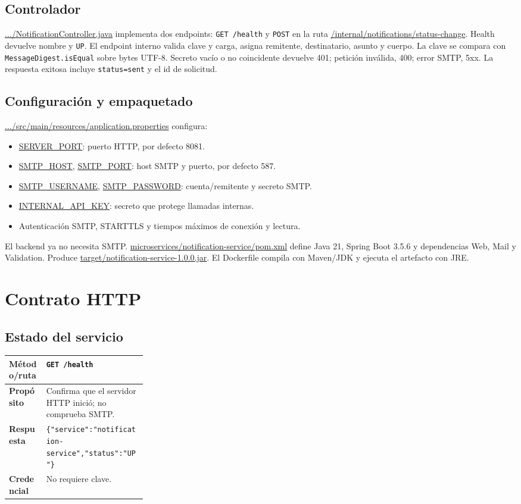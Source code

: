 \documentclass[11pt,a4paper]{article}
\newcommand{\pathcode}[1]{\small\url{#1}}\newcommand{\envvar}[1]{\small\url{#1}}
\begin{document}
\subsection{Controlador}
\pathcode{.../NotificationController.java} implementa dos endpoints: \texttt{GET /health} y \texttt{POST} en la ruta \pathcode{/internal/notifications/status-change}. Health devuelve nombre y \texttt{UP}. El endpoint interno valida clave y carga, asigna remitente, destinatario, asunto y cuerpo.
La clave se compara con \texttt{MessageDigest.isEqual} sobre bytes UTF-8. Secreto vacío o no coincidente devuelve 401; petición inválida, 400; error SMTP, 5xx. La respuesta exitosa incluye \texttt{status=sent} y el id de solicitud.

\subsection{Configuración y empaquetado}
\pathcode{.../src/main/resources/application.properties} configura:
\begin{itemize}
\item \envvar{SERVER_PORT}: puerto HTTP, por defecto 8081.
\item \envvar{SMTP_HOST}, \envvar{SMTP_PORT}: host SMTP y puerto, por defecto 587.
\item \envvar{SMTP_USERNAME}, \envvar{SMTP_PASSWORD}: cuenta/remitente y secreto SMTP.
\item \envvar{INTERNAL_API_KEY}: secreto que protege llamadas internas.
\item Autenticación SMTP, STARTTLS y tiempos máximos de conexión y lectura.
\end{itemize}
El backend ya no necesita SMTP. \pathcode{microservices/notification-service/pom.xml} define Java 21, Spring Boot 3.5.6 y dependencias Web, Mail y Validation. Produce \pathcode{target/notification-service-1.0.0.jar}. El Dockerfile compila con Maven/JDK y ejecuta el artefacto con JRE.

\section{Contrato HTTP}
\subsection{Estado del servicio}
\begin{tabularx}{\linewidth}{>{\bfseries}p{0.27\linewidth}X}\toprule
Método/ruta & \texttt{GET /health}\\\midrule
Propósito & Confirma que el servidor HTTP inició; no comprueba SMTP.\\
Respuesta & \texttt{\{"service":"notification-service","status":"UP"\}}\\
Credencial & No requiere clave.\\\bottomrule\end{tabularx}
\end{document}
